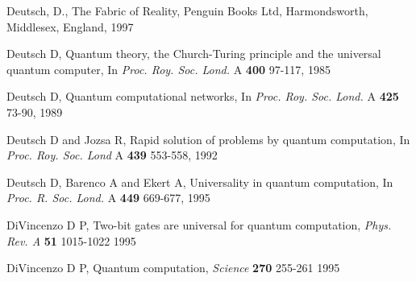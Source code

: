 \documentclass{article}
\begin{document}
\begin{thebibliography}{12}
Deutsch, D.,
The Fabric of Reality,
Penguin Books Ltd, Harmondsworth, Middlesex, England, 1997

Deutsch D,
Quantum theory, the Church-Turing principle and the
universal quantum computer,
In {\em Proc. Roy. Soc. Lond.} A {\bf 400} 97-117, 1985

Deutsch D,
Quantum computational networks,
In {\em Proc. Roy. Soc. Lond.} A {\bf 425} 73-90, 1989

Deutsch D and Jozsa R,
Rapid solution of problems by quantum computation,
In {\em Proc. Roy. Soc. Lond} A {\bf 439} 553-558, 1992


Deutsch D, Barenco A and Ekert A,  
Universality in quantum computation,
In {\em  Proc. R. Soc. Lond.} A {\bf 449} 669-677, 1995


% 
% 
% 
% 
% 

DiVincenzo D P,
Two-bit gates are universal for quantum computation,
{\em Phys. Rev. A} {\bf 51} 1015-1022 1995

DiVincenzo D P, 
Quantum computation,
{\em Science} {\bf 270} 255-261 1995



% 
% 
% 
% 
% 
% 
% 


\end{thebibliography}
\end{document}
